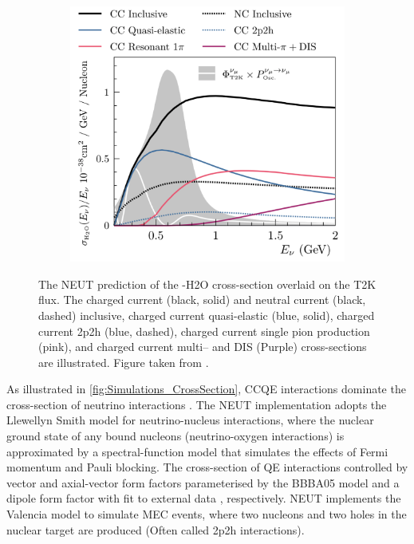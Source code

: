 \begin{figure}[h]
  \begin{subfigure}[t]{0.8\textwidth}
    \includegraphics[width=\textwidth, trim={0mm 0mm 0mm 0mm}, clip,page=1]{Figures/Simulations/NEUTCrossSection.pdf}
  \end{subfigure}
  \caption{The NEUT prediction of the \quickmath{\nu_{\mu}}-H2O cross-section overlaid on the T2K \quickmath{\nu_{\mu}} flux. The charged current (black, solid) and neutral current (black, dashed) inclusive, charged current quasi-elastic (blue, solid), charged current 2p2h (blue, dashed), charged current single pion production (pink), and charged current multi--\quickmath{\pi} and DIS (Purple) cross-sections are illustrated. Figure taken from \cite{Hayato2021}.}
  \label{fig:Simulations_CrossSection}
\end{figure}

As illustrated in \autoref{fig:Simulations_CrossSection}, CCQE interactions dominate the  cross-section of neutrino interactions . The NEUT implementation adopts the Llewellyn Smith \cite{llewelyn-smith} model for neutrino-nucleus interactions, where the nuclear ground state of any bound nucleons (neutrino-oxygen interactions) is approximated by a spectral-function \cite{Benhar1989} model that simulates the effects of Fermi momentum and Pauli blocking. The cross-section of QE interactions   controlled by vector and axial-vector form factors parameterised by the BBBA05 \cite{bbba05} model and a dipole form factor with  fit to external data \cite{Aguilar_Arevalo_2010}, respectively. NEUT implements the Valencia \cite{nieves2} model to simulate MEC events, where two nucleons and two holes in the nuclear target are produced (Often called 2p2h interactions).

